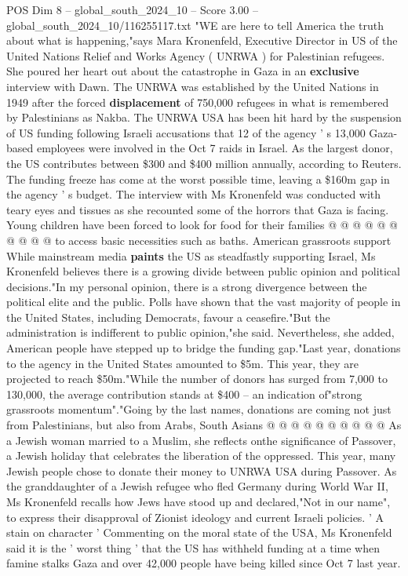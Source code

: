 \begin{textsample}{POS Dim 8 – global\_south\_2024\_10 – Score 3.00 – global\_south\_2024\_10/116255117.txt}  \label{ex:f8_pos_306}
"WE are here to tell America the truth about what is happening,"says Mara Kronenfeld, Executive Director in US of the United Nations Relief and Works Agency ( UNRWA ) for Palestinian refugees.
She poured her heart out about the catastrophe in Gaza in an \textbf{exclusive} interview with Dawn.
The UNRWA was established by the United Nations in 1949 after the forced \textbf{displacement} of 750,000 refugees in what is remembered by Palestinians as Nakba.
The UNRWA USA has been hit hard by the suspension of US funding following Israeli accusations that 12 of the agency ' s 13,000 Gaza-based employees were involved in the Oct 7 raids in Israel.
As the largest donor, the US contributes between \$300 and \$400 million annually, according to Reuters.
The funding freeze has come at the worst possible time, leaving a \$160m gap in the agency ' s budget.
The interview with Ms Kronenfeld was conducted with teary eyes and tissues as she recounted some of the horrors that Gaza is facing.
Young children have been forced to look for food for their families @ @ @ @ @ @ @ @ @ @ to access basic necessities such as baths.
American grassroots support While mainstream media \textbf{paints} the US as steadfastly supporting Israel, Ms Kronenfeld believes there is a growing divide between public opinion and political decisions."In my personal opinion, there is a strong divergence between the political elite and the public.
Polls have shown that the vast majority of people in the United States, including Democrats, favour a ceasefire."But the administration is indifferent to public opinion,"she said.
Nevertheless, she added, American people have stepped up to bridge the funding gap."Last year, donations to the agency in the United States amounted to \$5m.
This year, they are projected to reach \$50m."While the number of donors has surged from 7,000 to 130,000, the average contribution stands at \$400 -- an indication of"strong grassroots momentum"."Going by the last names, donations are coming not just from Palestinians, but also from Arabs, South Asians @ @ @ @ @ @ @ @ @ @ As a Jewish woman married to a Muslim, she reflects onthe significance of Passover, a Jewish holiday that celebrates the liberation of the oppressed.
This year, many Jewish people chose to donate their money to UNRWA USA during Passover.
As the granddaughter of a Jewish refugee who fled Germany during World War II, Ms Kronenfeld recalls how Jews have stood up and declared,"Not in our name", to express their disapproval of Zionist ideology and current Israeli policies. ' A stain on character ' Commenting on the moral state of the USA, Ms Kronenfeld said it is the ' worst thing ' that the US has withheld funding at a time when famine stalks Gaza and over 42,000 people have being killed since Oct 7 last year.

\end{textsample}
